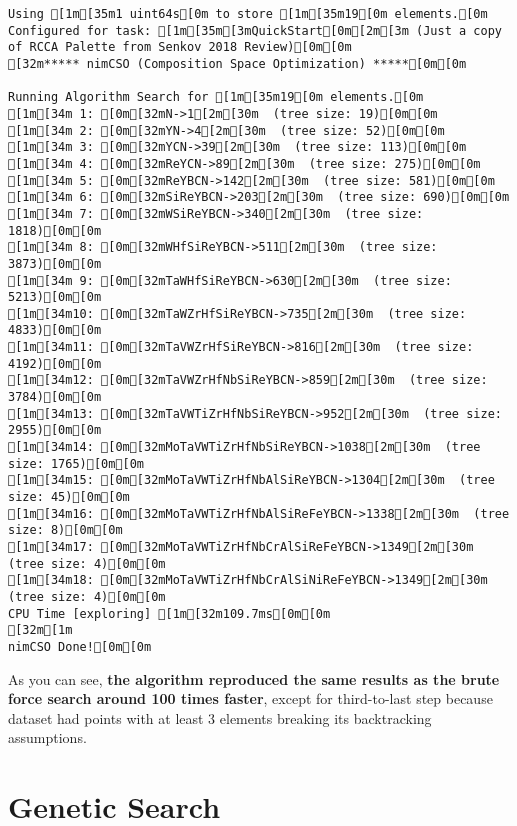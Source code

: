 \begin{verbatim}
Using [1m[35m1 uint64s[0m to store [1m[35m19[0m elements.[0m
Configured for task: [1m[35m[3mQuickStart[0m[2m[3m (Just a copy of RCCA Palette from Senkov 2018 Review)[0m[0m
[32m***** nimCSO (Composition Space Optimization) *****[0m[0m

Running Algorithm Search for [1m[35m19[0m elements.[0m
[1m[34m 1: [0m[32mN->1[2m[30m  (tree size: 19)[0m[0m
[1m[34m 2: [0m[32mYN->4[2m[30m  (tree size: 52)[0m[0m
[1m[34m 3: [0m[32mYCN->39[2m[30m  (tree size: 113)[0m[0m
[1m[34m 4: [0m[32mReYCN->89[2m[30m  (tree size: 275)[0m[0m
[1m[34m 5: [0m[32mReYBCN->142[2m[30m  (tree size: 581)[0m[0m
[1m[34m 6: [0m[32mSiReYBCN->203[2m[30m  (tree size: 690)[0m[0m
[1m[34m 7: [0m[32mWSiReYBCN->340[2m[30m  (tree size: 1818)[0m[0m
[1m[34m 8: [0m[32mWHfSiReYBCN->511[2m[30m  (tree size: 3873)[0m[0m
[1m[34m 9: [0m[32mTaWHfSiReYBCN->630[2m[30m  (tree size: 5213)[0m[0m
[1m[34m10: [0m[32mTaWZrHfSiReYBCN->735[2m[30m  (tree size: 4833)[0m[0m
[1m[34m11: [0m[32mTaVWZrHfSiReYBCN->816[2m[30m  (tree size: 4192)[0m[0m
[1m[34m12: [0m[32mTaVWZrHfNbSiReYBCN->859[2m[30m  (tree size: 3784)[0m[0m
[1m[34m13: [0m[32mTaVWTiZrHfNbSiReYBCN->952[2m[30m  (tree size: 2955)[0m[0m
[1m[34m14: [0m[32mMoTaVWTiZrHfNbSiReYBCN->1038[2m[30m  (tree size: 1765)[0m[0m
[1m[34m15: [0m[32mMoTaVWTiZrHfNbAlSiReYBCN->1304[2m[30m  (tree size: 45)[0m[0m
[1m[34m16: [0m[32mMoTaVWTiZrHfNbAlSiReFeYBCN->1338[2m[30m  (tree size: 8)[0m[0m
[1m[34m17: [0m[32mMoTaVWTiZrHfNbCrAlSiReFeYBCN->1349[2m[30m  (tree size: 4)[0m[0m
[1m[34m18: [0m[32mMoTaVWTiZrHfNbCrAlSiNiReFeYBCN->1349[2m[30m  (tree size: 4)[0m[0m
CPU Time [exploring] [1m[32m109.7ms[0m[0m
[32m[1m
nimCSO Done![0m[0m
\end{verbatim}

As you can see, \textbf{the algorithm reproduced the same results as the
brute force search around 100 times faster}, except for third-to-last
step because dataset had points with at least 3 elements breaking its
backtracking assumptions.

\hypertarget{genetic-search}{%
\section{Genetic Search}\label{nimcsotutorial:genetic-search}}

